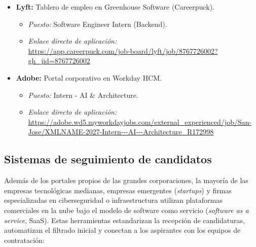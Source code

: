 \documentclass[12pt]{article}
\begin{document}
\begin{itemize}[leftmargin=0.2in, itemsep=0.3em]
    \item \textbf{Lyft:} Tablero de empleo en Greenhouse Software (Careerpuck).
    \begin{itemize}[leftmargin=0.15in, noitemsep]
        \item \textit{Puesto:} Software Engineer Intern (Backend).
        \item \textit{Enlace directo de aplicación:}\\ {\small\url{https://app.careerpuck.com/job-board/lyft/job/8767726002?gh_jid=8767726002}}
    \end{itemize}

    \item \textbf{Adobe:} Portal corporativo en Workday HCM.
    \begin{itemize}[leftmargin=0.15in, noitemsep]
        \item \textit{Puesto:} Intern - AI \& Architecture.
        \item \textit{Enlace directo de aplicación:}\\ {\footnotesize\url{https://adobe.wd5.myworkdayjobs.com/external_experienced/job/San-Jose/XMLNAME-2027-Intern---AI---Architecture_R172998}}
    \end{itemize}
\end{itemize}

\subsection{Sistemas de seguimiento de candidatos}
\label{sec:sistemasSeguimiento}

Además de los portales propios de las grandes corporaciones, la mayoría de las empresas tecnológicas medianas, empresas emergentes (\textit{startups}) y firmas especializadas en ciberseguridad o infraestructura utilizan plataformas comerciales en la nube bajo el modelo de software como servicio (\textit{software as a service}, SaaS). Estas herramientas estandarizan la recepción de candidaturas, automatizan el filtrado inicial y conectan a los aspirantes con los equipos de contratación:
\end{document}

